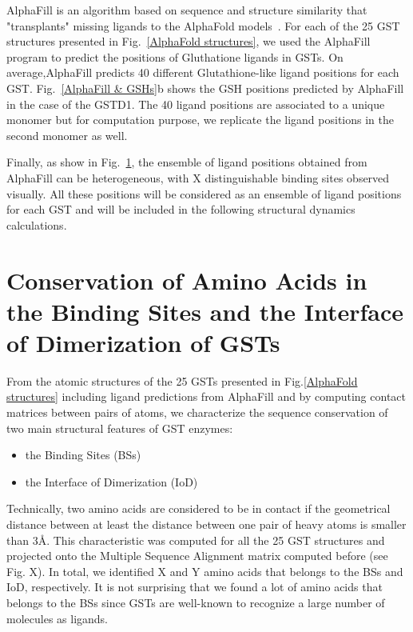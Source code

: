 AlphaFill is an algorithm based on sequence and structure similarity that "transplants" missing ligands to the AlphaFold models~\cite{AlphaFill}. For each of the 25 GST structures presented in Fig.~\ref{AlphaFold structures}, we used the AlphaFill program to predict the positions of Gluthatione ligands in GSTs. On average,AlphaFill predicts 40 different Glutathione-like ligand positions for each GST. Fig.~\ref{AlphaFill & GSHs}b shows the GSH positions predicted by AlphaFill in the case of the GSTD1. The 40 ligand positions are associated to a unique monomer but for computation purpose, we replicate the ligand positions in the second monomer as well.

Finally, as show in Fig.~\ref{}, the ensemble of ligand positions obtained from AlphaFill can be heterogeneous, with X distinguishable binding sites observed visually. All these positions will be considered as an ensemble of ligand positions for each GST and will be included in the following structural dynamics calculations.

\section{Conservation of Amino Acids in the Binding Sites and the Interface of Dimerization of GSTs}

From the atomic structures of the 25 GSTs presented in Fig.\ref{AlphaFold structures} including ligand predictions from AlphaFill and by computing contact matrices between pairs of atoms, we characterize the sequence conservation of two main structural features of GST enzymes:
\begin{itemize}
	\item the Binding Sites (BSs)
	\item the Interface of Dimerization (IoD)
\end{itemize}

Technically, two amino acids are considered to be in contact if the geometrical distance between at least the distance between one pair of heavy atoms is smaller than $3$\AA. This characteristic was computed for all the 25 GST structures and projected onto the Multiple Sequence Alignment matrix computed before (see Fig. X). In total, we identified X and Y amino acids that belongs to the BSs and IoD, respectively. It is not surprising that we found a lot of amino acids that belongs to the BSs since GSTs are well-known to recognize a large number of molecules as ligands.

